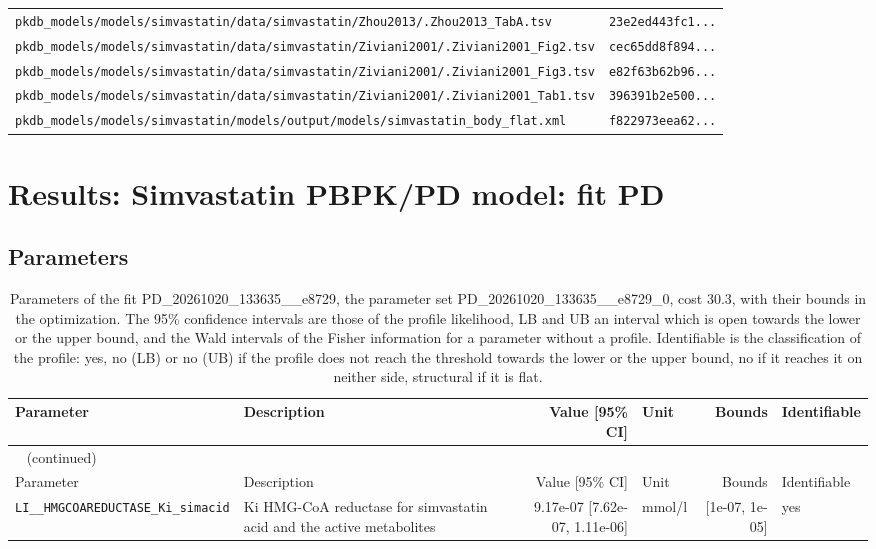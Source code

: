 \begin{longtable}{ll}
\texttt{pkdb\_models/models/simvastatin/data/simvastatin/Zhou2013/.Zhou2013\_TabA.tsv} & \texttt{23e2ed443fc1...} \\
\texttt{pkdb\_models/models/simvastatin/data/simvastatin/Ziviani2001/.Ziviani2001\_Fig2.tsv} & \texttt{cec65dd8f894...} \\
\texttt{pkdb\_models/models/simvastatin/data/simvastatin/Ziviani2001/.Ziviani2001\_Fig3.tsv} & \texttt{e82f63b62b96...} \\
\texttt{pkdb\_models/models/simvastatin/data/simvastatin/Ziviani2001/.Ziviani2001\_Tab1.tsv} & \texttt{396391b2e500...} \\
\texttt{pkdb\_models/models/simvastatin/models/output/models/simvastatin\_body\_flat.xml} & \texttt{f822973eea62...} \\
\end{longtable}

\section{Results: Simvastatin PBPK/PD model: fit PD}

\subsection{Parameters}

\begin{longtable}{llrlrl}
\caption{Parameters of the fit PD\_20261020\_133635\_\_e8729, the parameter set PD\_20261020\_133635\_\_e8729\_0, cost 30.3, with their bounds in the optimization. The 95\% confidence intervals are those of the profile likelihood, LB and UB an interval which is open towards the lower or the upper bound, and the Wald intervals of the Fisher information for a parameter without a profile. Identifiable is the classification of the profile: yes, no (LB) or no (UB) if the profile does not reach the threshold towards the lower or the upper bound, no if it reaches it on neither side, structural if it is flat.}\label{tab:parameters:PD_20261020_133635__e8729} \\
\toprule
Parameter & Description & Value [95\% CI] & Unit & Bounds & Identifiable \\
\midrule
\endfirsthead
\multicolumn{6}{l}{\small\tablename~\thetable{} (continued)} \\
\toprule
Parameter & Description & Value [95\% CI] & Unit & Bounds & Identifiable \\
\midrule
\endhead
\bottomrule
\endlastfoot
\texttt{LI\_\_HMGCOAREDUCTASE\_Ki\_simacid} & Ki HMG-CoA reductase for simvastatin acid and the active metabolites & 9.17e-07 [7.62e-07, 1.11e-06] & mmol/l & [1e-07, 1e-05] & yes \\
\end{longtable}

